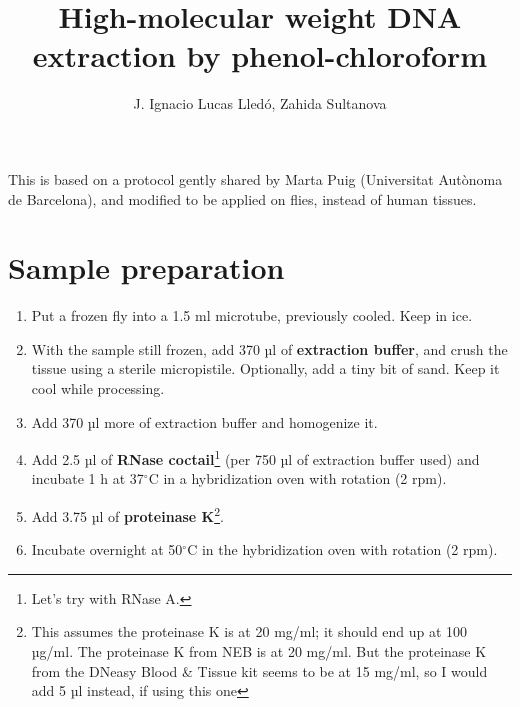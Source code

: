 \documentclass{article}
\title{High-molecular weight DNA extraction by phenol-chloroform}
\author{J. Ignacio Lucas Lledó, Zahida Sultanova}
\begin{document}
\maketitle
This is based on a protocol gently shared by Marta Puig (Universitat Autònoma de Barcelona), and modified to be applied on flies, instead of human tissues.
\section{Sample preparation}
\begin{enumerate}
   \item Put a frozen fly into a 1.5 ml microtube, previously cooled. Keep in ice.
   \item With the sample still frozen, add 370 µl of \textbf{extraction buffer}, and crush the tissue using a sterile micropistile. Optionally, add a tiny bit of sand. Keep it cool while processing.
   \item Add 370 µl more of extraction buffer and homogenize it.
   \item Add 2.5 µl of \textbf{RNase coctail}\footnote{Let's try with RNase A.} (per 750 µl of extraction buffer used) and incubate 1 h at 37$^\circ{}$C in a hybridization oven with rotation (2 rpm).
   \item Add 3.75 µl of \textbf{proteinase K}\footnote{This assumes the proteinase K is at 20 mg/ml; it should end up at 100 µg/ml. The proteinase K from NEB is at 20 mg/ml. But the proteinase K from the DNeasy Blood \& Tissue kit seems to be at 15 mg/ml, so I would add 5 µl instead, if using this one}.
   \item Incubate overnight at 50$^\circ{}$C in the hybridization oven with rotation (2 rpm).
\end{enumerate}
\end{document}
